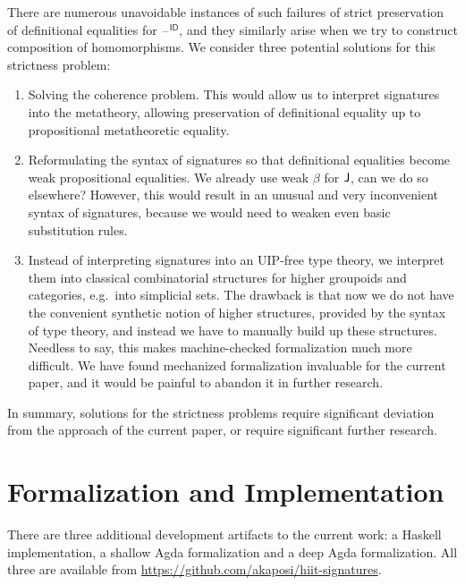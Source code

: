 \documentclass[dvipsnames]{lmcs} %
\newcommand{\blank}{\mathord{\hspace{1pt}\text{--}\hspace{1pt}}}
\newcommand{\1}{\mathsf{1}} \renewcommand{\Pr}{\mathsf{Pr}}
\theoremstyle{plain}\newtheorem{satz}[thm]{Satz} %
\begin{document}
There are numerous unavoidable instances of such failures of strict preservation
of definitional equalities for $\blank^{\mathsf{ID}}$, and they similarly arise when we
try to construct composition of homomorphisms. We consider three potential
solutions for this strictness problem:
\begin{enumerate}
\item Solving the coherence problem. This would allow us to interpret signatures
      into the metatheory, allowing preservation of definitional equality up
      to propositional metatheoretic equality.
\item Reformulating the syntax of signatures so that definitional equalities
      become weak propositional equalities. We already use weak $\beta$ for $\mathsf{J}$,
      can we do so elsewhere? However, this would result in an unusual and very
      inconvenient syntax of signatures, because we would need to weaken even
      basic substitution rules.
\item Instead of interpreting signatures into an UIP-free type theory, we
      interpret them into classical combinatorial structures for higher groupoids
      and categories, e.g.\ into simplicial sets. The drawback is that now we do not
      have the convenient synthetic notion of higher structures, provided by the syntax
      of type theory, and instead we have to manually build up these
      structures. Needless to say, this makes machine-checked formalization much
      more difficult. We have found mechanized formalization invaluable for the
      current paper, and it would be painful to abandon it in further research.
\end{enumerate}

In summary, solutions for the strictness problems require significant deviation
from the approach of the current paper, or require significant further research.



\section{Formalization and Implementation}
\label{sec:formalization}

There are three additional development artifacts to the current work: a Haskell
implementation, a shallow Agda formalization and a deep Agda formalization. All
three are available from \url{https://github.com/akaposi/hiit-signatures}.
\end{document}
